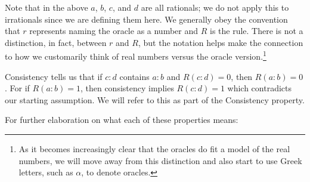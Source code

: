 \documentclass[12pt]{article}
\theoremstyle{remark}
\begin{document}
Note that in the above $a$, $b$, $c$, and $d$ are all rationals; we do not apply this to irrationals since we are defining them here. We generally obey the convention that $r$ represents naming the oracle as a number and $R$ is the rule. There is not a distinction, in fact, between $r$ and $R$, but the notation helps make the connection to how we customarily think of real numbers versus the oracle version.\footnote{As it becomes increasingly clear that the oracles do fit a model of the real numbers, we will move away from this distinction and also start to use Greek letters, such as $\alpha$, to denote oracles.}

Consistency tells us that if $c:d$ contains $a:b$ and $R(c:d) = 0$, then $R(a:b) = 0$. For if $R(a:b)=1$, then consistency implies $R(c:d)=1$ which contradicts our starting assumption. We will refer to this as part of the Consistency property. 

For further elaboration on what each of these properties means:
\end{document}
